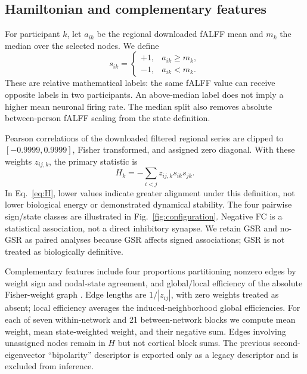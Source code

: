 \documentclass[10pt,letterpaper]{article}
\begin{document}
\subsection*{Hamiltonian and complementary features}
For participant $k$, let $a_{ik}$ be the regional downloaded fALFF mean and
$m_k$ the median over the selected nodes. We define
\begin{equation}
s_{ik}=\begin{cases}+1,&a_{ik}\geq m_k,\\-1,&a_{ik}<m_k.\end{cases}
\end{equation}
These are relative mathematical labels: the same fALFF value can receive opposite
labels in two participants. An above-median label does not imply a higher mean
neuronal firing rate. The median split also removes absolute between-person
fALFF scaling from the state definition.

Pearson correlations of the downloaded filtered regional series are clipped to
$[-0.9999,0.9999]$, Fisher transformed, and assigned zero diagonal. With these
weights $z_{ij,k}$, the primary statistic is
\begin{equation}
H_k=-\sum_{i<j}z_{ij,k}s_{ik}s_{jk}.\label{eq:H}
\end{equation}
In Eq.~\ref{eq:H}, lower values indicate greater alignment under this definition,
not lower biological
energy or demonstrated dynamical stability. The four pairwise sign/state classes
are illustrated in Fig.~\ref{fig:configuration}. Negative FC is a statistical association,
not a direct inhibitory synapse. We retain GSR and no-GSR as paired analyses because
GSR affects signed associations; GSR is not treated as biologically definitive.

Complementary features include four proportions partitioning nonzero edges by
weight sign and nodal-state agreement, and global/local efficiency of the absolute
Fisher-weight graph \cite{latora2001}. Edge lengths are $1/|z_{ij}|$, with zero
weights treated as absent; local efficiency averages the induced-neighborhood
global efficiencies. For each of seven within-network and 21 between-network
blocks we compute mean weight, mean state-weighted weight, and their negative sum.
Edges involving unassigned nodes remain in $H$ but not cortical block sums.
The previous second-eigenvector ``bipolarity'' descriptor is exported only as a
legacy descriptor and is excluded from inference.
\end{document}
